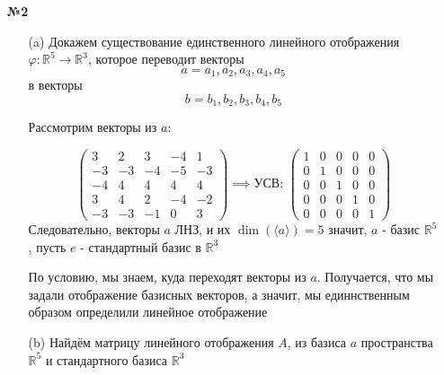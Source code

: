 \documentclass[a4paper]{article}
\newcommand{\mat}[1]{\begin{pmatrix} #1 \end{pmatrix}}
\newcommand{\RR}{\mathbb{R}}
\begin{document}
\begin{enumerate}
    \item[\textbf{№2}]\begin{enumerate}
        \item[(a)]Докажем существование единственного линейного отображения 
        $\varphi: \mathbb{R}^{5} \rightarrow \mathbb{R}^{3}$, которое переводит 
        векторы $$a = a_{1}, a_{2}, a_{3}, a_{4}, a_{5}$$ в векторы 
        $$b = b_{1}, b_{2}, b_{3}, b_{4}, b_{5}$$

        Рассмотрим векторы из $a$:

        $$\mat{3 & 2 & 3 & -4 & 1 \\
        -3 & -3 & -4 & -5 & -3 \\
        -4 & 4 & 4 & 4 & 4 \\
        3 & 4 & 2 & -4 & -2 \\
        -3 & -3 & -1 & 0 & 3} \implies \text{УСВ: } 
        \mat{1 & 0 & 0 & 0 & 0 \\
        0 & 1 & 0 & 0 & 0 \\
        0 & 0 & 1 & 0 & 0 \\
        0 & 0 & 0 & 1 & 0 \\
        0 & 0 & 0 & 0 & 1}$$
        Следовательно, векторы $a$ ЛНЗ, и их $\dim(\langle a\rangle) = 5$ значит, 
        $a$ - базис $\RR^5$, пусть $e$ - стандартный базис в $\RR^3$

        По условию, мы знаем, куда переходят векторы из $a$. 
        Получается, что мы задали отображение базисных векторов, а
        значит, мы единнственным образом определили линейное отображение
        
        \item[(b)]Найдём матрицу линейного отображения $A$,
         из базиса $a$ пространства  $\RR^5$  и
        стандартного базиса $\RR^3$
        

\end{enumerate}
\end{enumerate}
\end{document}
